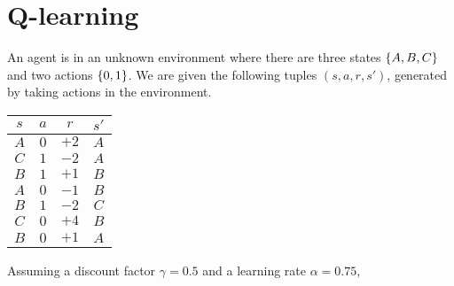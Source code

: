\documentclass[11pt, a4paper]{article}
\begin{document}
\newpage

\section{Q-learning}

An agent is in an unknown environment where there are three states $\{A, B, C\}$ and two actions $\{0, 1\}$. We are given the following tuples $(s, a, r, s')$, generated by taking actions in the environment.

\begin{table}[h]
    \centering
    \begin{tabular}{cccc}
        \toprule
        $s$ & $a$ & $r$ & $s'$ \\
        \midrule
        $A$ & $0$ & $+2$ & $A$ \\
        $C$ & $1$ & $-2$ & $A$ \\
        $B$ & $1$ & $+1$ & $B$ \\
        $A$ & $0$ & $-1$ & $B$ \\
        $B$ & $1$ & $-2$ & $C$ \\
        $C$ & $0$ & $+4$ & $B$ \\
        $B$ & $0$ & $+1$ & $A$ \\
        \bottomrule
    \end{tabular}
\end{table}

Assuming a discount factor $\gamma = 0.5$ and a learning rate $\alpha = 0.75$,
\end{document}
